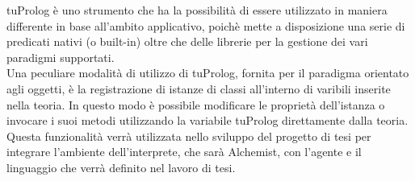 tuProlog è uno strumento che ha la possibilità di essere utilizzato in maniera differente in base all'ambito applicativo, poichè mette a disposizione una serie di predicati nativi (o built-in) oltre che delle librerie per la gestione dei vari paradigmi supportati.
\\
Una peculiare modalità di utilizzo di tuProlog, fornita per il paradigma orientato agli oggetti,  è la registrazione di istanze di classi all'interno di varibili inserite nella teoria. In questo modo è possibile modificare le proprietà dell'istanza o invocare i suoi metodi utilizzando la variabile tuProlog direttamente dalla teoria.
\\
Questa funzionalità verrà utilizzata nello sviluppo del progetto di tesi per integrare l'ambiente dell'interprete, che sarà Alchemist, con l'agente e il linguaggio che verrà definito nel lavoro di tesi.
